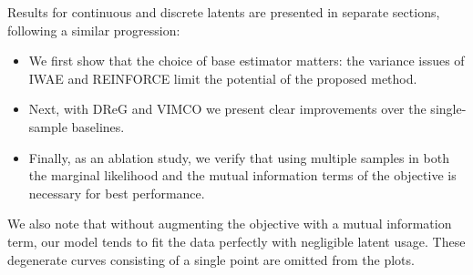 Results for continuous and discrete latents are presented in separate sections, following a similar progression:
\begin{itemize}
\item We first show that the choice of base estimator matters: the variance issues of IWAE and REINFORCE limit the potential of the proposed method.
\item Next, with DReG and VIMCO we present clear improvements over the single-sample baselines.
\item Finally, as an ablation study, we verify that using multiple samples in both the marginal likelihood and the mutual information terms of the objective is necessary for best performance.
\end{itemize}
We also note that without augmenting the objective with a mutual information term, our model tends to fit the data perfectly with negligible latent usage.
These degenerate curves consisting of a single point are omitted from the plots.

